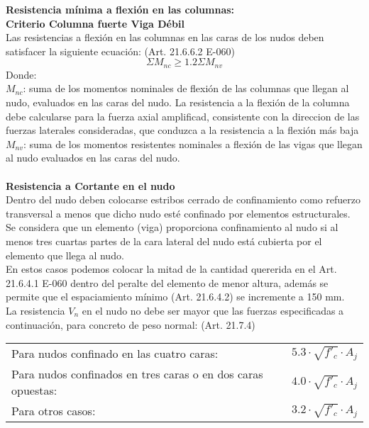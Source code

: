 \documentclass[12pt]{article}
\begin{document}
        \noindent \textbf{Resistencia mínima a flexión en las columnas:}\\
        \textbf{Criterio Columna fuerte Viga Débil}\\
        Las resistencias a flexión en las columnas en las caras de los nudos deben satisfacer la siguiente ecuación: (Art. 21.6.6.2 E-060)\\
        \[\Sigma M_{nc} \geq 1.2 \Sigma M_{nv}\]
        Donde:\\
        $M_{nc}$: suma de los momentos nominales de flexión de las columnas que llegan al nudo, evaluados en las caras del nudo. La resistencia a la flexión de la columna debe calcularse para la fuerza axial amplificad, consistente con la direccion de las fuerzas laterales consideradas, que conduzca a la resistencia a la flexión más baja\\
        $M_{nv}$: suma de los momentos resistentes nominales a flexión de las vigas que llegan al nudo evaluados en las caras del nudo.\\ \\
        \textbf{Resistencia a Cortante en el nudo} \\
        Dentro del nudo deben colocarse estribos cerrado de confinamiento como refuerzo transversal a menos que dicho nudo esté confinado por elementos estructurales.\\
        Se considera que un elemento (viga) proporciona confinamiento al nudo si al menos tres cuartas partes de la cara lateral del nudo está cubierta por el elemento que llega al nudo. \\
        En estos casos podemos colocar la mitad de la cantidad quererida en el Art. 21.6.4.1 E-060 dentro del peralte del elemento de menor altura, además se permite que el espaciamiento mínimo (Art. 21.6.4.2) se incremente a 150 mm. \\
        La resistencia $V_n$ en el nudo no debe ser mayor que las fuerzas especificadas a continuación, para concreto de peso normal: (Art. 21.7.4) \\
    
        \begin{tabular}{ll}
            Para nudos confinado en las cuatro caras: & $5.3 \cdot \sqrt{f'_c} \cdot A_j$ \\
            Para nudos confinados en tres caras o en dos caras opuestas: & $4.0 \cdot \sqrt{f'_c} \cdot A_j$ \\
            Para otros casos: & $3.2 \cdot \sqrt{f'_c} \cdot A_j$  
        \end{tabular} \\ \\
\end{document}
